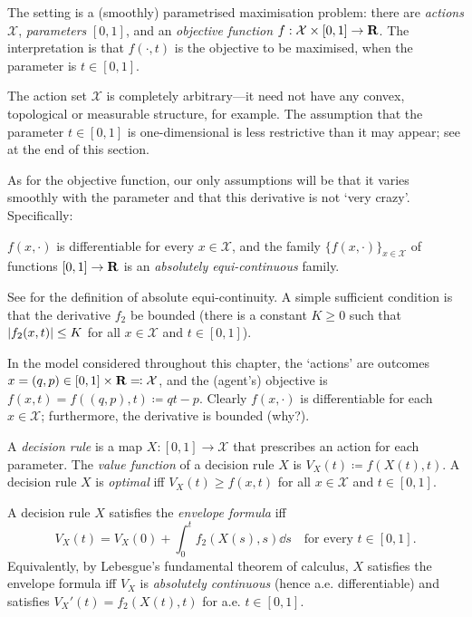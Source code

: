 The setting is a (smoothly) parametrised maximisation problem:
there are \emph{actions} $\mathcal{X}$, \emph{parameters} $[0,1]$, and an \emph{objective function} $f : \mathcal{X} \times [0,1] \to \mathbf{R}$.
The interpretation is that
$f(\cdot,t)$ is the objective to be maximised, when the parameter is $t \in [0,1]$.

The action set $\mathcal{X}$ is completely arbitrary---it need not have any convex, topological or measurable structure, for example.
The assumption that the parameter $t \in [0,1]$ is one-dimensional is less restrictive than it may appear; see  at the end of this section.

As for the objective function, our only assumptions will be that it varies smoothly with the parameter and that this derivative is not `very crazy'. Specifically:

\begin{namedthm}
	\label{assumption:basic}
	$f(x,\cdot)$ is differentiable for every $x \in \mathcal{X}$,
	and the family $\{ f(x,\cdot) \}_{ x \in \mathcal{X} }$ of functions $[0,1] \to \mathbf{R}$ is an \emph{absolutely equi-continuous} family.
\end{namedthm}

See \textcite{Sinander2022} for the definition of absolute equi-continuity.
A simple sufficient condition is that the derivative $f_2$ be bounded (there is a constant $K \geq 0$ such that $\abs*{f_2(x,t)} \leq K$ for all $x \in \mathcal{X}$ and $t \in [0,1]$).

\begin{example}
	\label{example:env_mech}
	In the model considered throughout this chapter,
	the `actions' are outcomes $x = (q,p) \in [0,1] \times \mathbf{R} \eqqcolon \mathcal{X}$, and the (agent's) objective is $f(x,t) = f((q,p),t) \coloneqq qt - p$.
	Clearly $f(x,\cdot)$ is differentiable for each $x \in \mathcal{X}$; furthermore, the derivative is bounded (why?).
\end{example}

A \emph{decision rule} is a map $X : [0,1] \to \mathcal{X}$ that prescribes an action for each parameter.
The \emph{value function} of a decision rule $X$ is $V_X(t) \coloneqq f(X(t),t)$.
A decision rule $X$ is \emph{optimal} iff $V_X(t) \geq f(x,t)$ for all $x \in \mathcal{X}$ and $t \in [0,1]$.

A decision rule $X$ satisfies the \emph{envelope formula} iff
%
\begin{equation*}
	V_X(t) = V_X(0) + \int_0^t f_2(X(s),s) \dd s
	\quad \text{for every $t \in [0,1]$.}
\end{equation*}
%
Equivalently, by Lebesgue's fundamental theorem of calculus,
$X$ satisfies the envelope formula iff
$V_X$ is \emph{absolutely continuous} (hence a.e. differentiable) and satisfies $V_X'(t) = f_2(X(t),t)$ for a.e. $t \in [0,1]$.


